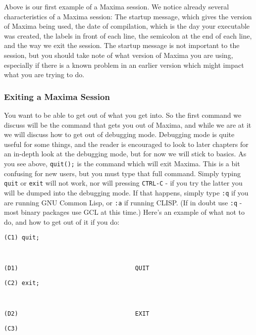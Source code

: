 \vspace{3ex}

Above is our first example of a Maxima session. We notice already
several characteristics of a Maxima session: The startup message,
which gives the version of Maxima being used, the date of compilation, 
which is the day your executable was created, the labels in front of
each line, the semicolon at the end of each line, and the way we exit
the session. The startup message is not important to the session,
but you should take note of what version of Maxima you are using,
especially if there is a known problem in an earlier version which
might impact what you are trying to do. 


\subsubsection{Exiting a
Maxima Session}

You want to be able to get out of what you get into. So the first
command we discuss will be the command that gets you out of Maxima,
and while we are at it we will discuss how to get out of debugging
mode. Debugging mode is quite useful for some things, and the reader
is encouraged to look to later chapters for an in-depth look at the
debugging mode, but for now we will stick to basics. As you see above,
\texttt{quit();} is the command which will exit Maxima. This is a
bit confusing for new users, but you must type that full command.
Simply typing \texttt{quit} or \texttt{exit} will not work, nor will
pressing \texttt{CTRL-C} - if you try the latter you will be dumped
into the debugging mode. If that happens, simply type \texttt{:q}
if you are running GNU Common Lisp, or \texttt{:a} if running CLISP.
(If in doubt use \texttt{:q} - most binary packages use GCL at this
time.) Here's an example of what not to do, and how to get out of
it if you do:

\vspace{3ex}

\texttt{\label{Quitting Maxima (Example 2)}(C1) quit;}

\texttt{~}

\texttt{(D1)~~~~~~~~~~~~~~~~~~~~~~~~~~~~~~~~
QUIT}

\texttt{(C2) exit;}

\texttt{~}

\texttt{(D2)~~~~~~~~~~~~~~~~~~~~~~~~~~~~~~~~
EXIT}

\texttt{(C3) }

